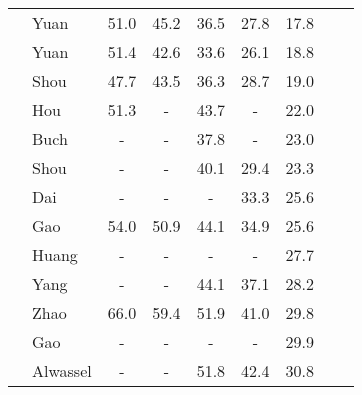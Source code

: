 \documentclass[10pt,journal,compsoc]{IEEEtran}
\begin{document}
\begin{table}[!tb]
\begin{tabular}{clccccccc}
			&Yuan \etal \cite{Yuan2017}       & 51.0          & 45.2          & 36.5          & 27.8          & 17.8                    \\
			&Yuan \etal \cite{yuan2016temporal}       & 51.4          & 42.6          & 33.6          & 26.1          & 18.8                   \\
			&Shou \etal \cite{shou2016temporal}       & 47.7          & 43.5          & 36.3          & 28.7          & 19.0                   \\
			&Hou \etal \cite{hou2017real}             & 51.3          & -             & 43.7          & -            & 22.0                      \\
			&Buch \etal  \cite{buch2017sst}           & -             & -             & 37.8          & -             & 23.0                    \\
			&Shou \etal \cite{shou2017cdc}            & -             & -            & 40.1          & 29.4          & 23.3                    \\
			&Dai \etal \cite{dai2017temporal}         & -             & -            & -             & 33.3          & 25.6                  \\
			&Gao \etal \cite{gao2017turn}             & 54.0          & 50.9          & 44.1          & 34.9          & 25.6                   \\
			&Huang \etal  
			\cite{huang2018sap}      & -          & -          & -          & -          & 27.7                   \\
			&Yang \etal \cite{yang2018exploring}       & -          & -          & 44.1          & 37.1          & 28.2                   \\
			&Zhao \etal \cite{zhao2017temporal}       & 66.0          & 59.4          & 51.9          & 41.0          & 29.8                   \\ 
			&Gao \etal \cite{gao2018ctap}        & -          & -          & -          & -          & 29.9                 \\	
			&Alwassel \etal \cite{alwassel2018action}       & -          & -          & 51.8          & 42.4          & 30.8                   \\

\end{tabular}
\end{table}
\end{document}
